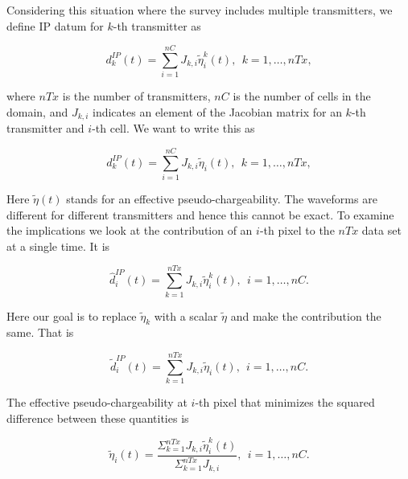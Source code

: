 \documentclass[extra,mreferee]{gji}
\newcommand{\peta}{\tilde{\eta}}
\newcommand{\dip}{d^{IP}}
\begin{document}
Considering this situation where the survey includes multiple transmitters, we define IP datum for $k$-th transmitter as 
\begin{linenomath*}
\begin{equation}
  \dip_k(t) = \sum_{i=1}^{nC}J_{k,i}\peta^k_i (t), \ \ k=1, \ldots, nTx,
  \label{eq: dip_kthTx}
\end{equation}
\end{linenomath*}
where $nTx$ is the number of transmitters, $nC$ is the number of cells in the domain, and $J_{k,i}$ indicates an element of the Jacobian matrix for an $k$-th transmitter and $i$-th cell. We want to write this as 
\begin{linenomath*}
\begin{equation}
  \dip_k(t) = \sum_{i=1}^{nC}J_{k,i}\peta_i (t), \ \ k=1, \ldots, nTx,
  \label{eq: dipeff_kthTx}
\end{equation}
\end{linenomath*}
Here $\peta(t)$ stands for an effective pseudo-chargeability.
The waveforms are different for different transmitters and hence this cannot be exact. To examine the implications we look at the contribution of an $i$-th pixel to the $nTx$ data set at a single time. 
It is 
\begin{linenomath*}
\begin{equation}
  \hat{d}^{IP}_i(t) =\sum_{k=1}^{nTx} J_{k,i} \peta^k_i(t), \ \ i=1, \ldots, nC.
  \label{eq: dip_hat}
\end{equation}
\end{linenomath*}
Here our goal is to replace $\peta_k$ with a scalar $\peta$ and make the contribution the same. That is 
\begin{linenomath*}
\begin{equation}
  \tilde{d}^{IP}_i(t) =\sum_{k=1}^{nTx} J_{k,i} \peta_i(t), \ \ i=1, \ldots, nC.
  \label{eq: dip_tilde}
\end{equation}
\end{linenomath*}
The effective pseudo-chargeability at $i$-th pixel that minimizes the squared difference between these quantities is 
\begin{linenomath*}
\begin{equation}
  \peta_i(t) = \frac {\Sigma_{k=1}^{nTx} J_{k,i}\peta^k_i(t)} {\Sigma_{k=1}^{nTx} J_{k,i}}, \ \ i=1, \ldots, nC.
  \label{eq: petaeff}
\end{equation}
\end{linenomath*}
\end{document}
